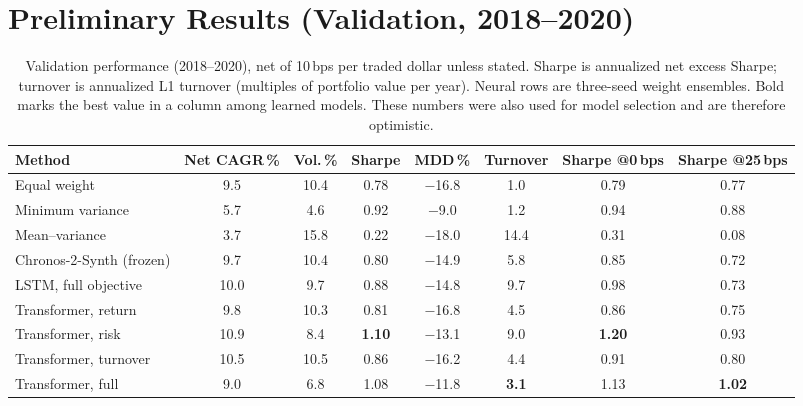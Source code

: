 \documentclass[10pt,twocolumn,letterpaper]{article}
\begin{document}
\section{Preliminary Results (Validation, 2018--2020)}

\begin{table}[t]
\centering
\small
\setlength{\tabcolsep}{6pt}
\begin{tabular}{lccccccc}
\toprule
Method & Net CAGR\,\% & Vol.\,\% & Sharpe & MDD\,\% & Turnover & Sharpe @0\,bps & Sharpe @25\,bps \\
\midrule
Equal weight             &  9.5 & 10.4 & 0.78 & $-$16.8 &  1.0 & 0.79 & 0.77 \\
Minimum variance         &  5.7 &  4.6 & 0.92 &  $-$9.0 &  1.2 & 0.94 & 0.88 \\
Mean--variance           &  3.7 & 15.8 & 0.22 & $-$18.0 & 14.4 & 0.31 & 0.08 \\
Chronos-2-Synth (frozen) &  9.7 & 10.4 & 0.80 & $-$14.9 &  5.8 & 0.85 & 0.72 \\
LSTM, full objective     & 10.0 &  9.7 & 0.88 & $-$14.8 &  9.7 & 0.98 & 0.73 \\
\midrule
Transformer, return      &  9.8 & 10.3 & 0.81 & $-$16.8 &  4.5 & 0.86 & 0.75 \\
Transformer, risk        & 10.9 &  8.4 & \textbf{1.10} & $-$13.1 &  9.0 & \textbf{1.20} & 0.93 \\
Transformer, turnover    & 10.5 & 10.5 & 0.86 & $-$16.2 &  4.4 & 0.91 & 0.80 \\
Transformer, full        &  9.0 &  6.8 & 1.08 & $-$11.8 &  \textbf{3.1} & 1.13 & \textbf{1.02} \\
\bottomrule
\end{tabular}
\caption{Validation performance (2018--2020), net of 10\,bps per traded dollar unless stated.
Sharpe is annualized net excess Sharpe; turnover is annualized L1 turnover (multiples of
portfolio value per year). Neural rows are three-seed weight ensembles. Bold marks the best
value in a column among learned models. These numbers were also used for model selection and
are therefore optimistic.}
\label{tab:val}
\end{table}
\end{document}
